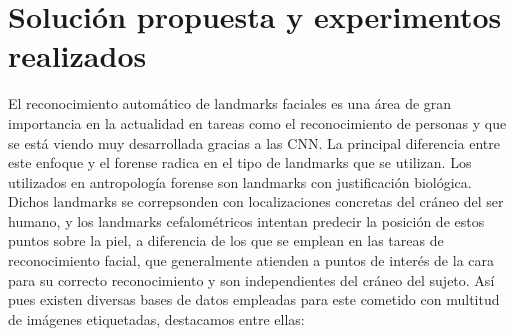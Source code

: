 \chapter{Solución propuesta y experimentos realizados}

    \noindent El reconocimiento automático de landmarks faciales es una área de gran importancia en la actualidad en tareas como el reconocimiento de personas y que se está viendo muy desarrollada gracias a las CNN. La principal diferencia entre este enfoque y el forense radica en el tipo de landmarks que se utilizan. Los utilizados en antropología forense son landmarks con justificación biológica. Dichos landmarks se correpsonden con localizaciones concretas del cráneo del ser humano, y los landmarks cefalométricos intentan predecir la posición de estos puntos sobre la piel, a diferencia de los que se emplean en las tareas de reconocimiento facial, que generalmente atienden a puntos de interés de la cara para su correcto reconocimiento y son independientes del cráneo del sujeto. Así pues existen diversas bases de datos empleadas para este cometido con multitud de imágenes etiquetadas, destacamos entre ellas: 


